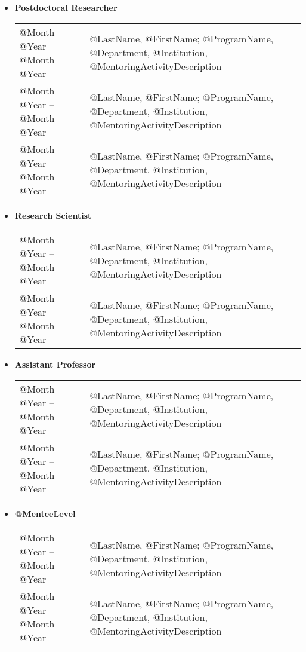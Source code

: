 \documentclass[10pt]{article}
\begin{document}
\begin{IOWA ONLY}
\begin{itemize}
\item[] \textbf{Postdoctoral Researcher}
\\[1.3ex]
\begin{tabular}{l@{\quad\ }p{30em}} 
 @Month @Year -- @Month @Year
 & @LastName, @FirstName; @ProgramName, @Department, @Institution, 
   @MentoringActivityDescription
 \\[3.5ex]
 @Month @Year -- @Month @Year
 & @LastName, @FirstName; @ProgramName, @Department, @Institution, 
   @MentoringActivityDescription
 \\[3.5ex]
 @Month @Year -- @Month @Year
 & @LastName, @FirstName; @ProgramName, @Department, @Institution, 
   @MentoringActivityDescription
 \\[3.5ex]
\end{tabular}

\item[] \textbf{Research Scientist}
\\[1.3ex]
\begin{tabular}{l@{\quad\ }p{30em}} 
 @Month @Year -- @Month @Year
 & @LastName, @FirstName; @ProgramName, @Department, @Institution,
   @MentoringActivityDescription
 \\[3.5ex]
 @Month @Year -- @Month @Year
 & @LastName, @FirstName; @ProgramName, @Department, @Institution,
   @MentoringActivityDescription
 \\[3.5ex]
\end{tabular}

\item[] \textbf{Assistant Professor}
\\[1.3ex]
\begin{tabular}{l@{\quad\ }p{30em}} 
 @Month @Year -- @Month @Year
 & @LastName, @FirstName; @ProgramName, @Department, @Institution,
   @MentoringActivityDescription
 \\[3.5ex]
 @Month @Year -- @Month @Year
 & @LastName, @FirstName; @ProgramName, @Department, @Institution,
   @MentoringActivityDescription
 \\[3.5ex]
\end{tabular}

\item[] \textbf{@MenteeLevel}
\\[1.3ex]
\begin{tabular}{l@{\quad\ }p{30em}} 
 @Month @Year -- @Month @Year
 & @LastName, @FirstName; @ProgramName, @Department, @Institution,
   @MentoringActivityDescription
 \\[3.5ex]
 @Month @Year -- @Month @Year
 & @LastName, @FirstName; @ProgramName, @Department, @Institution,
   @MentoringActivityDescription
 \\[3.5ex]
\end{tabular}
\end{itemize}

\end{IOWA ONLY}
\end{document}
